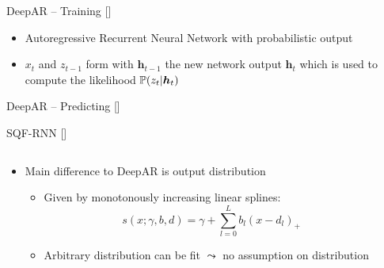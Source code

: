 \documentclass[10pt,aspectratio=169]{beamer}
\begin{document}
\begin{frame}[fragile]{DeepAR -- Training [\cite{Salinas2017}]}
    \begin{center}
        
    \end{center}
    \begin{itemize}
        \item Autoregressive Recurrent Neural Network with probabilistic output
        \item \(x_t\) and \(z_{t-1}\) form with \(\boldsymbol{h}_{t-1}\) the new network output \(\boldsymbol{h}_t\)
        which is used to compute the likelihood \(\P(z_t | \boldsymbol{h}_t)\)
    \end{itemize}
\end{frame}

\begin{frame}[fragile]{DeepAR -- Predicting [\cite{Salinas2017}]}
    \begin{center}
        
    \end{center}
    \begin{itemize}
    \end{itemize}
\end{frame}

\begin{frame}{SQF-RNN [\cite{Gasthaus2019}]}
    \begin{columns}
    \begin{column}{0.6\textwidth}
    \begin{itemize}
        \item Main difference to DeepAR is output distribution
        \begin{itemize}
            \item Given by monotonously increasing linear splines: 
            \[ s(x; \gamma, b, d) = \gamma + \sum_{l=0}^L b_l (x - d_l)_+ \]
            \item Arbitrary distribution can be fit \(\leadsto\) no assumption on distribution
        \end{itemize}
    \end{itemize}
    \end{column}

    \begin{column}{0.35\textwidth}
    \end{column}
    \end{columns}
\end{frame}
\end{document}

